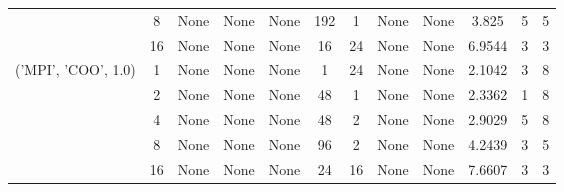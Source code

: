 \begin{tabular}{cccccccccccc}
& 8& None& None& None& 192& 1& None& None& 3.825& 5& 5\\
& 16& None& None& None& 16& 24& None& None& 6.9544& 3& 3\\
\hline
\multirow{5}{*}{('MPI', 'COO', 1.0)}& 1& None& None& None& 1& 24& None& None& 2.1042& 3& 8\\
& 2& None& None& None& 48& 1& None& None& 2.3362& 1& 8\\
& 4& None& None& None& 48& 2& None& None& 2.9029& 5& 8\\
& 8& None& None& None& 96& 2& None& None& 4.2439& 3& 5\\
& 16& None& None& None& 24& 16& None& None& 7.6607& 3& 3\\
\hline
\end{tabular}
